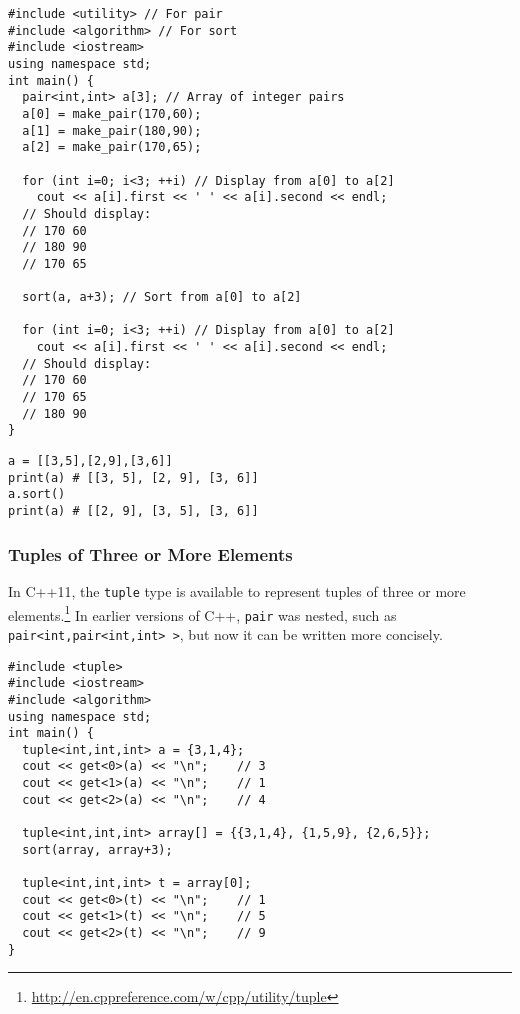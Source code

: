 \begin{cbox}
\begin{verbatim}
#include <utility> // For pair
#include <algorithm> // For sort
#include <iostream>
using namespace std;
int main() {
  pair<int,int> a[3]; // Array of integer pairs
  a[0] = make_pair(170,60);
  a[1] = make_pair(180,90);
  a[2] = make_pair(170,65);

  for (int i=0; i<3; ++i) // Display from a[0] to a[2]
    cout << a[i].first << ' ' << a[i].second << endl;
  // Should display:
  // 170 60
  // 180 90
  // 170 65

  sort(a, a+3); // Sort from a[0] to a[2]

  for (int i=0; i<3; ++i) // Display from a[0] to a[2]
    cout << a[i].first << ' ' << a[i].second << endl;
  // Should display:
  // 170 60
  // 170 65
  // 180 90
}
\end{verbatim}
\end{cbox}

\begin{pybox}
\begin{verbatim}
a = [[3,5],[2,9],[3,6]]
print(a) # [[3, 5], [2, 9], [3, 6]]
a.sort()
print(a) # [[2, 9], [3, 5], [3, 6]]
\end{verbatim}
\end{pybox}

\subsubsection{Tuples of Three or More Elements}
In C++11, the \texttt{tuple} type is available to represent tuples of three or more elements.\footnote{\url{http://en.cppreference.com/w/cpp/utility/tuple}}
In earlier versions of C++, \texttt{pair} was nested, such as \texttt{pair<int,pair<int,int> >}, but now it can be written more concisely.

\begin{c11box}[emph={tuple}]
\begin{verbatim}
#include <tuple>
#include <iostream>
#include <algorithm>
using namespace std;
int main() {
  tuple<int,int,int> a = {3,1,4};
  cout << get<0>(a) << "\n";	// 3
  cout << get<1>(a) << "\n";	// 1
  cout << get<2>(a) << "\n";	// 4

  tuple<int,int,int> array[] = {{3,1,4}, {1,5,9}, {2,6,5}};
  sort(array, array+3);
  
  tuple<int,int,int> t = array[0];
  cout << get<0>(t) << "\n";	// 1
  cout << get<1>(t) << "\n";	// 5
  cout << get<2>(t) << "\n";	// 9
}
\end{verbatim}
\end{c11box}
